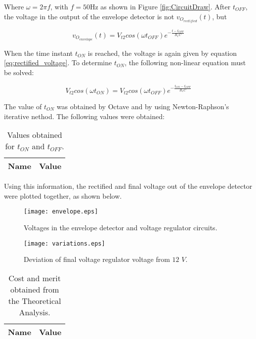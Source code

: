 Where $\omega=2\pi f$, with $f=50$Hz as shown in Figure \ref{fig:CircuitDraw}. After $t_{OFF}$, the voltage in the output of the envelope detector is not $v_{O_{rectified}}(t)$, but

\begin{equation} \label{eq:exponential_voltage}
  v_{O_{envelope}}(t)=V_{t2}cos(\omega t_{OFF})e^{-\frac{t-t_{OFF}}{R_1C}}
\end{equation}

When the time instant $t_{ON}$ is reached, the voltage is again given by equation \ref{eq:rectified_voltage}. To determine $t_{ON}$, the following non-linear equation must be solved:

\begin{equation} \label{eq:non_linear_equation_tON}
  V_{t2}cos(\omega t_{ON})=V_{t2}cos(\omega t_{OFF})e^{-\frac{t_{ON}-t_{OFF}}{R_1 C}}
\end{equation}

The value of $t_{ON}$ was obtained by Octave and by using Newton-Raphson's iterative nethod. The following values were obtained:

\begin{table}[H]
  \centering
  \begin{tabular}{|c|c|}
    \hline    
    {\bf Name} & {\bf Value} \\ \hline
    
  \end{tabular}
  \caption{Values obtained for $t_{ON}$ and $t_{OFF}$.}
  \label{tab:tON_tOFF}
\end{table}

Using this information, the rectified and final voltage out of the envelope detector were plotted together, as shown below.


\begin{figure}[H] \centering
  \texttt{[image: envelope.eps]}
  \caption{Voltages in the envelope detector and voltage regulator circuits.}
  \label{fig:envelope_regulator_voltages}
\end{figure}

\begin{figure}[H] \centering
  \texttt{[image: variations.eps]}
  \caption{Deviation of final voltage regulator voltage from $12$ $V$.}
  \label{fig:voltage_variation}
\end{figure}

\begin{table}[H]
  \centering
  \begin{tabular}{|c|c|}
    \hline    
    {\bf Name} & {\bf Value} \\ \hline
    
  \end{tabular}
  \caption{Cost and merit obtained from the Theoretical Analysis.}
  \label{tab:Cost_Merit}
\end{table}
